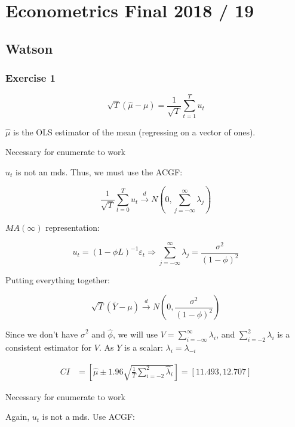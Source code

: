 \section{Econometrics Final 2018 / 19}

{
\subsection*{Watson}

{
\subsubsection*{Exercise 1}

$$
\sqrt{T}(\hat{\mu}-\mu)=\frac{1}{\sqrt{T}} \sum_{t=1}^{T} u_t
$$

$\hat{\mu}$ is the OLS estimator of the mean (regressing on a vector of ones).

\begin{enumerate}[label=(\alph*)]
{\item \color{white} Necessary for enumerate to work \color{black}
\begin{enumerate}[label=(\roman*)]
{\item 
$u_{t}$ is not an mds. Thus, we must use the ACGF:

$$
\frac{1}{\sqrt{T}} \sum_{t=0}^{T} u_{t} \xrightarrow{d} N\left(0, \sum_{j=-\infty}^{\infty} \lambda_{j}\right)
$$

$M A(\infty)$ representation:

$$
u_{t}=(1-\phi L)^{-1} \varepsilon_{t} \Rightarrow \sum_{j=-\infty}^{\infty} \lambda_{j}=\frac{\sigma^{2}}{(1-\phi)^{2}}
$$

Putting everything together:

$$
\sqrt{T}(\bar{Y}-\mu) \xrightarrow{d} N\left(0, \frac{\sigma^{2}}{(1-\phi)^{2}}\right)
$$}
{\item 
Since we don't have $\hat{\sigma}^{2}$ and $\hat{\phi}$, we will use $V=\sum_{i=-\infty}^{\infty} \lambda_{i}$, and $\sum_{i=-2}^{2} \lambda_{i}$ is a consistent estimator for $V$. As $Y$ is a scalar: $\lambda_{i}=\lambda_{-i}$

$$
\begin{aligned}
C I & =\left[\hat{\mu} \pm 1.96 \sqrt{\frac{1}{T} \sum_{i=-2}^{2} \hat{\lambda}_{i}}\right] =[11.493,12.707]
\end{aligned}
$$
}
\end{enumerate}
}
{\item \color{white} Necessary for enumerate to work \color{black}
\begin{enumerate}[label=(\roman*)]
{\item 
Again, $u_t$ is not a mds. Use ACGF:

}
\end{enumerate}}
\end{enumerate}}}
